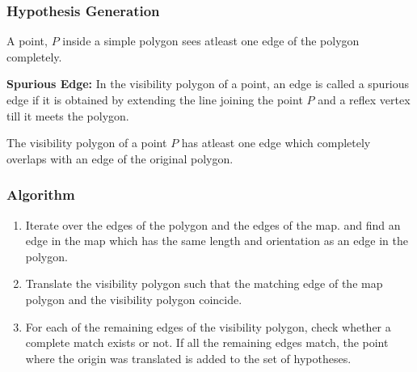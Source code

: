 \documentclass{beamer}
\begin{document}
\frame
{
 \frametitle{Hypothesis Generation}

\begin{theorem}
 A point, $P$ inside a simple polygon sees atleast one edge of the polygon completely.
\end{theorem}

\begin{definition}
 {\bf Spurious Edge:} In the visibility polygon of a point, an edge is called a spurious edge if it is obtained by extending the line
 joining the point $P$ and a reflex vertex till it meets the polygon.
\end{definition}


\begin{theorem}
 The visibility polygon of a point $P$ has atleast one edge which completely overlaps with an edge of the original polygon.
\end{theorem}

}


\frame
{
\frametitle{Algorithm}
\begin{enumerate}
 \item Iterate over the edges of the polygon and the edges of the map. and find an edge in the map which has the same length and
 orientation as an edge in the polygon.

 \item
 Translate the visibility polygon such that the matching edge of the map polygon
and the visibility polygon coincide.

 \item
 For each of the remaining edges of the visibility polygon, check whether a 
complete match exists or not. If all the remaining edges match, the point where the
origin was translated is added to the set of hypotheses.

\end{enumerate}

}
\end{document}
